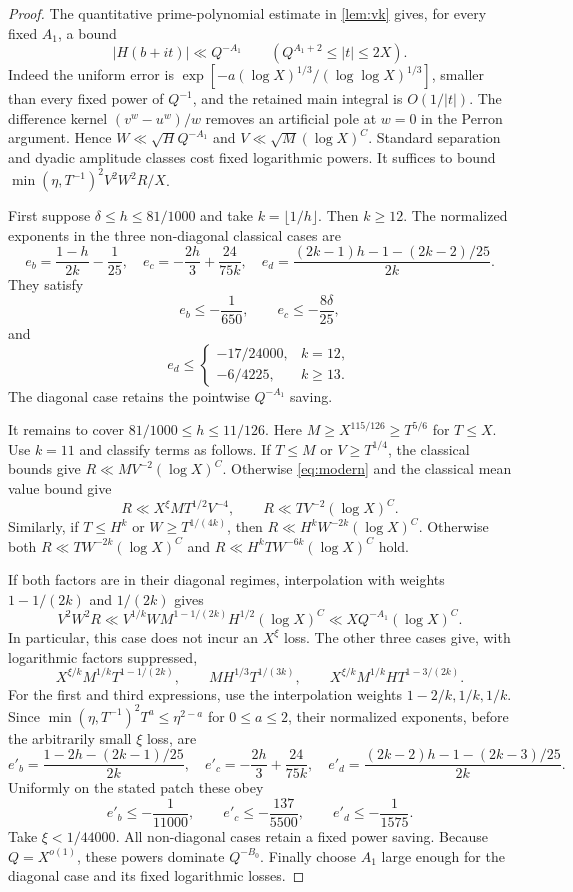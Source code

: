 \begin{proof}
The quantitative prime-polynomial estimate in \cref{lem:vk} gives, for every fixed $A_1$, a bound
\[
 |H(b+it)|\ll Q^{-A_1}
 \qquad(Q^{A_1+2}\le |t|\le 2X).
\]
Indeed the uniform error is
$\exp[-a(\log X)^{1/3}/(\log\log X)^{1/3}]$, smaller than every fixed
power of $Q^{-1}$, and the retained main integral is $O(1/|t|)$.
The difference kernel $(v^w-u^w)/w$ removes an artificial pole at
$w=0$ in the Perron argument.
Hence
$W\ll\sqrt H Q^{-A_1}$ and $V\ll\sqrt M(\log X)^C$.
Standard separation and dyadic amplitude classes cost fixed
logarithmic powers. It suffices to bound
$\min(\eta,T^{-1})^2V^2W^2R/X$.

First suppose $\delta\le h\le81/1000$ and take $k=\lfloor1/h\rfloor$.
Then $k\ge12$. The normalized exponents in the three non-diagonal
classical cases are
\[
 e_b=\frac{1-h}{2k}-\frac1{25},\quad
 e_c=-\frac{2h}{3}+\frac{24}{75k},\quad
 e_d=\frac{(2k-1)h-1-(2k-2)/25}{2k}.
\]
They satisfy
\[
 e_b\le-\frac1{650},\qquad e_c\le-\frac{8\delta}{25},
\]
and
\[
 e_d\le
 \begin{cases}-17/24000,&k=12,\\-6/4225,&k\ge13.\end{cases}
\]
The diagonal case retains the pointwise $Q^{-A_1}$ saving.

It remains to cover $81/1000\le h\le11/126$.
Here $M\ge X^{115/126}\ge T^{5/6}$ for $T\le X$.
Use $k=11$ and classify terms as follows.
If $T\le M$ or $V\ge T^{1/4}$, the classical bounds give
$R\ll MV^{-2}(\log X)^C$.
Otherwise \eqref{eq:modern} and the classical mean value bound give
\[
 R\ll X^\xi MT^{1/2}V^{-4},\qquad
 R\ll TV^{-2}(\log X)^C.
\]
Similarly, if $T\le H^k$ or $W\ge T^{1/(4k)}$, then
$R\ll H^kW^{-2k}(\log X)^C$.
Otherwise both
$R\ll TW^{-2k}(\log X)^C$ and
$R\ll H^kTW^{-6k}(\log X)^C$ hold.

If both factors are in their diagonal regimes, interpolation with
weights $1-1/(2k)$ and $1/(2k)$ gives
\[
 V^2W^2R
 \ll V^{1/k}WM^{1-1/(2k)}H^{1/2}(\log X)^C
 \ll XQ^{-A_1}(\log X)^C.
\]
In particular, this case does not incur an $X^\xi$ loss.
The other three cases give, with logarithmic factors suppressed,
\[
 X^{\xi/k}M^{1/k}T^{1-1/(2k)},\qquad
 MH^{1/3}T^{1/(3k)},\qquad
 X^{\xi/k}M^{1/k}HT^{1-3/(2k)}.
\]
For the first and third expressions, use the interpolation weights
$1-2/k,1/k,1/k$.
Since
$\min(\eta,T^{-1})^2T^a\le\eta^{2-a}$ for $0\le a\le2$,
their normalized exponents, before the arbitrarily small $\xi$ loss,
are
\[
 e'_b=\frac{1-2h-(2k-1)/25}{2k},\quad
 e'_c=-\frac{2h}{3}+\frac{24}{75k},\quad
 e'_d=\frac{(2k-2)h-1-(2k-3)/25}{2k}.
\]
Uniformly on the stated patch these obey
\begin{equation}\label{eq:pairgaps}
 e'_b\le-\frac1{11000},\qquad
 e'_c\le-\frac{137}{5500},\qquad
 e'_d\le-\frac1{1575}.
\end{equation}
Take $\xi<1/44000$. All non-diagonal cases retain a fixed power
saving. Because $Q=X^{o(1)}$, these powers dominate $Q^{-B_0}$.
Finally choose $A_1$ large enough for the diagonal case and its
fixed logarithmic losses.
\end{proof}

